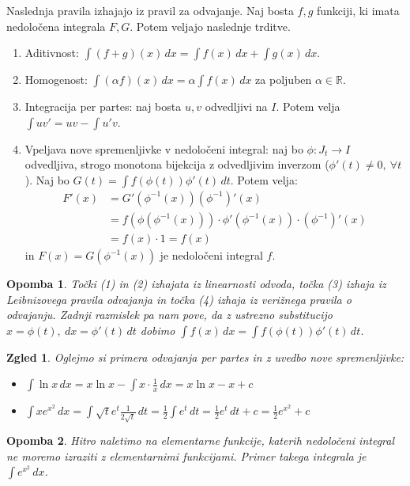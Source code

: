 \documentclass[10pt, a4paper]{article}
\newtheorem*{opomba}{Opomba}
\newtheorem{zgled}[izr]{Zgled}
\newcommand{\R}{\mathbb {R}}
\begin{document}
Naslednja pravila izhajajo iz pravil za odvajanje.
Naj bosta $f,g$ funkciji, ki imata nedoločena integrala $F, G$.
Potem veljajo naslednje trditve.
\begin{enumerate}
    \item Aditivnost: $\int (f+g)(x)\,dx = \int f(x)\,dx + \int g(x)\,dx$.
    \item Homogenost: $\int (\alpha f) (x)\,dx = \alpha \int f(x)\,dx$ za poljuben $\alpha \in \R$.
    \item Integracija per partes: naj bosta $u,v$ odvedljivi na $I$. Potem velja
    $\int u v' = u v - \int u' v.$
    \item Vpeljava nove spremenljivke v nedoločeni integral:
    naj bo $\phi: J_t \rightarrow I$ odvedljiva, strogo monotona bijekcija z odvedljivim inverzom ($\phi'(t) \neq 0,\ \forall t$).
    Naj bo $G(t) = \int f(\phi (t)) \phi'(t)\,dt$. Potem velja:
    \begin{align*}
        F'(x) &= G'(\phi^{-1} (x)) (\phi^{-1})' (x)\\
        &= f(\phi (\phi^{-1} (x))) \cdot \phi'(\phi^{-1}(x)) \cdot (\phi^{-1})'(x)\\
        &= f(x) \cdot 1 = f(x)
    \end{align*} 
    in $F(x) = G(\phi^{-1} (x))$ je nedoločeni integral $f$.
\end{enumerate}


\begin{opomba}
    Točki (1) in (2) izhajata iz linearnosti odvoda, točka (3) izhaja iz Leibnizovega pravila odvajanja in točka (4) izhaja iz verižnega pravila o odvajanju.
    Zadnji razmislek pa nam pove, da z ustrezno substitucijo $x = \phi(t),\ dx = \phi'(t)\,dt$ dobimo $\int f(x)\,dx = \int f(\phi(t)) \phi'(t)\,dt$.
\end{opomba}

\begin{zgled}
    Oglejmo si primera odvajanja per partes in z uvedbo nove spremenljivke:
    \begin{itemize}
        \item $\int \ln x\,dx = x \ln x - \int x \cdot \frac{1}{x}\,dx = x \ln x - x + c$
        \item $\int x e^{x^2}\,dx = \int \sqrt{t} e^t \frac{1}{2 \sqrt{t}}\,dt = \frac{1}{2} \int e^t\,dt = \frac{1}{2} e^t\,dt + c= \frac{1}{2}e^{x^2} + c$
    \end{itemize}
\end{zgled}

\begin{opomba}
    Hitro naletimo na elementarne funkcije, katerih nedoločeni integral ne moremo izraziti z elementarnimi funkcijami.
    Primer takega integrala je $\int e^{x^2}\,dx$.
\end{opomba}
\end{document}

